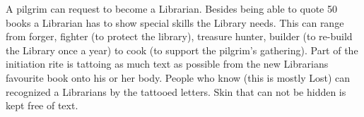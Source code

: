 A pilgrim can request to become a Librarian. Besides being able to quote 50 books a Librarian has to show special skills the Library needs. This can range from forger, fighter (to protect the library), treasure hunter, builder (to re-build the Library once a year) to cook (to support the pilgrim's gathering).
Part of the initiation rite is tattoing as much text as possible from the new Librarians favourite book onto his or her body. People who know (this is mostly Lost) can recognized a Librarians by the tattooed letters.
Skin that can not be hidden is kept free of text.


